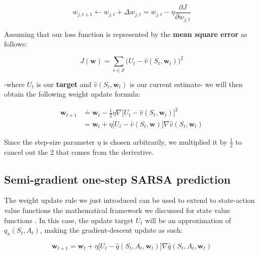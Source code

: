 \begin{equation}
    w_{j,t+1} \leftarrow w_{j,t} + \Delta w_{j,t} = w_{j,t} - \eta \frac{\partial J}{\partial w_{j,t}}
    \label{eq:ch7-singlesgdfunctionapproxupdate}
\end{equation}

Assuming that our loss function is represented by the \textbf{mean square error} as follows:

\begin{equation}
    J(\boldsymbol{w}) = \sum_{s \in \mathcal{S}} \big(U_t - \hat{v}(S_t, \boldsymbol{w}_t) \big)^2
    \label{eq:ch7-meansquareerrorfunction}
\end{equation}

-where $U_t$ is our \textbf{target} and $\hat{v}(S_t, \boldsymbol{w}_t)$ is our current estimate- we will then obtain the following weight update formula:

\begin{equation}
    \begin{split}
        \boldsymbol{w}_{t+1} &\doteq \boldsymbol{w}_t - \frac{1}{2} \eta \nabla \big[ U_t - \hat{v}(S_t, \boldsymbol{w}_t) \big]^2 \\
        &= \boldsymbol{w}_t + \eta \big[ U_t - \hat{v}(S_t, \boldsymbol{w}) \big] \nabla \hat{v} (S_t, \boldsymbol{w}_t)
    \end{split}
    \label{eq:ch7-genericstatefunctionapproxssdweightupdate}
\end{equation}

Since the step-size parameter $\eta$ is chosen arbitrarily, we multiplied it by $\frac{1}{2}$ to cancel out the 2 that comes from the derivative.

\subsection{Semi-gradient one-step SARSA prediction}
The weight update rule we just introduced can be used to extend to state-action value functions the mathematical framework we discussed for state value functions . In this case, the update target $U_t$ will be an approximation of $q_\pi (S_t,A_t )$, making the gradient-descent update as such:

\begin{equation}
    \boldsymbol{w}_{t+1} = \boldsymbol{w}_t + \eta \big[ U_t - \hat{q}(S_t,A_t,\boldsymbol{w}_t) \big] \nabla \hat{q}(S_t,A_t,\boldsymbol{w}_t)
    \label{eq:ch7-genericqvaluefunctionapproxssdweightupdate}
\end{equation}

